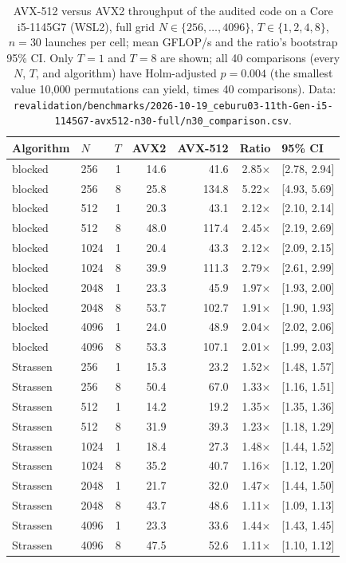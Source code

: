 \documentclass[acmsmall]{acmart}
\begin{document}
\begin{table}[h]
\centering
\small
\caption{AVX-512 versus AVX2 throughput of the audited code on a Core
i5-1145G7 (WSL2), full grid $N\in\{256,\dots,4096\}$, $T\in\{1,2,4,8\}$,
$n{=}30$ launches per cell; mean GFLOP/s and the ratio's bootstrap 95\%
CI. Only $T{=}1$ and $T{=}8$ are shown; all 40 comparisons (every $N$,
$T$, and algorithm) have Holm-adjusted $p=0.004$ (the smallest value
10{,}000 permutations can yield, times 40 comparisons). Data:
\texttt{revalidation/benchmarks/2026-10-19\_ceburu03-11th-Gen-i5-1145G7-avx512-n30-full/n30\_comparison.csv}.}
\label{tab:avx512}
\begin{tabular}{llrrrrl}
\toprule
Algorithm & $N$ & $T$ & AVX2 & AVX-512 & Ratio & 95\% CI \\
\midrule
blocked  &  256 & 1 & 14.6 & 41.6  & 2.85$\times$ & [2.78, 2.94] \\
blocked  &  256 & 8 & 25.8 & 134.8 & 5.22$\times$ & [4.93, 5.69] \\
blocked  &  512 & 1 & 20.3 & 43.1  & 2.12$\times$ & [2.10, 2.14] \\
blocked  &  512 & 8 & 48.0 & 117.4 & 2.45$\times$ & [2.19, 2.69] \\
blocked  & 1024 & 1 & 20.4 & 43.3  & 2.12$\times$ & [2.09, 2.15] \\
blocked  & 1024 & 8 & 39.9 & 111.3 & 2.79$\times$ & [2.61, 2.99] \\
blocked  & 2048 & 1 & 23.3 & 45.9  & 1.97$\times$ & [1.93, 2.00] \\
blocked  & 2048 & 8 & 53.7 & 102.7 & 1.91$\times$ & [1.90, 1.93] \\
blocked  & 4096 & 1 & 24.0 & 48.9  & 2.04$\times$ & [2.02, 2.06] \\
blocked  & 4096 & 8 & 53.3 & 107.1 & 2.01$\times$ & [1.99, 2.03] \\
Strassen &  256 & 1 & 15.3 & 23.2  & 1.52$\times$ & [1.48, 1.57] \\
Strassen &  256 & 8 & 50.4 & 67.0  & 1.33$\times$ & [1.16, 1.51] \\
Strassen &  512 & 1 & 14.2 & 19.2  & 1.35$\times$ & [1.35, 1.36] \\
Strassen &  512 & 8 & 31.9 & 39.3  & 1.23$\times$ & [1.18, 1.29] \\
Strassen & 1024 & 1 & 18.4 & 27.3  & 1.48$\times$ & [1.44, 1.52] \\
Strassen & 1024 & 8 & 35.2 & 40.7  & 1.16$\times$ & [1.12, 1.20] \\
Strassen & 2048 & 1 & 21.7 & 32.0  & 1.47$\times$ & [1.44, 1.50] \\
Strassen & 2048 & 8 & 43.7 & 48.6  & 1.11$\times$ & [1.09, 1.13] \\
Strassen & 4096 & 1 & 23.3 & 33.6  & 1.44$\times$ & [1.43, 1.45] \\
Strassen & 4096 & 8 & 47.5 & 52.6  & 1.11$\times$ & [1.10, 1.12] \\
\bottomrule
\end{tabular}
\end{table}
\end{document}
